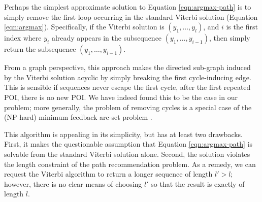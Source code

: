 
Perhaps the simplest approximate solution to Equation \ref{eqn:argmax-path} is to simply remove the first loop occurring in the standard Viterbi solution (Equation \ref{eqn:argmax}).
Specifically, if the Viterbi solution is $( y_1, \ldots, y_l )$,
and $i$ is the first index where $y_i$ already appears in the subsequence $( y_1, \ldots, y_{i-1} )$,
then simply return the subsequence $( y_1, \ldots, y_{i-1} )$.

From a graph perspective, this approach makes the directed sub-graph induced by the Viterbi solution acyclic
by simply breaking the first cycle-inducing edge.
This is sensible if sequences never escape the first cycle, \ie after the first repeated POI, there is no new POI.
We have indeed found this to be the case in our problem; %
more generally, %
the problem of removing cycles is a special case of the ({\sf NP}-hard) minimum feedback arc-set problem \citep[pg.\ 192]{Garey:1990}.

This algorithm is appealing in its simplicity,
but has at least two drawbacks.
First, it makes the questionable assumption that Equation \ref{eqn:argmax-path} is solvable from the standard Viterbi solution alone.
Second, the solution violates the length constraint of the path recommendation problem.
As a remedy, we can request the Viterbi algorithm to return a longer sequence of length $l' > l$;
however, there is no clear means of choosing $l'$ so that the result is exactly of length $l$.

